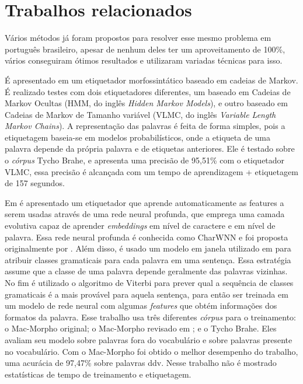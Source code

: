\chapter{Trabalhos relacionados}\label{trabalhosrelacionados}

Vários métodos já foram propostos para resolver esse mesmo problema em português brasileiro, apesar de nenhum deles ter um aproveitamento de 100\%, vários conseguiram ótimos resultados e utilizaram variadas técnicas para isso.

É apresentado em \cite{kepler2005etiquetador} um etiquetador morfossintático baseado em cadeias de Markov. É realizado testes com dois etiquetadores diferentes, um baseado em Cadeias de Markov Ocultas (HMM, do inglês \textit{Hidden Markov Models}), e outro baseado em Cadeias de Markov de Tamanho variável (VLMC, do inglês \textit{Variable Length Markov Chains}). A representação das palavras é feita de forma simples, pois a etiquetagem baseia-se em modelos probabilísticos, onde a etiqueta de uma palavra depende da própria palavra e de etiquetas anteriores. Ele é testado sobre o \textit{córpus} Tycho Brahe, e apresenta uma precisão de 95,51\% com o etiquetador VLMC, essa precisão é alcançada com um tempo de aprendizagem + etiquetagem de 157 segundos. 

Em \cite{dos2014training} é apresentado um etiquetador que aprende automaticamente as features a serem usadas através de uma rede neural profunda, que emprega uma camada evolutiva capaz de aprender \textit{embeddings} em nível de caractere e em nível de palavra. Essa rede neural profunda é conhecida como CharWNN e foi proposta originalmente por . Além disso, é usado um modelo em janela utilizado em \cite{collobert2011natural} para atribuir classes gramaticais para cada palavra em uma sentença. Essa estratégia assume que a classe de uma palavra depende geralmente das palavras vizinhas. No fim é utilizado o algoritmo de Viterbi \cite{viterbi1967error} para prever qual a sequência de classes gramaticais é a mais provável para aquela sentença, para então ser treinada em um modelo de rede neural com algumas \textit{features} que obtém informações dos formatos da palavra. Esse trabalho usa três diferentes \textit{córpus} para o treinamento: o Mac-Morpho original; o Mac-Morpho revisado em \cite{fonseca2013mac}; e o Tycho Brahe. Eles avaliam seu modelo sobre palavras fora do vocabulário e sobre palavras presente no vocabulário. Com o Mac-Morpho foi obtido o melhor desempenho do trabalho, uma acurácia de 97,47\% sobre palavras \ac{ddv}. Nesse trabalho não é mostrado estatísticas de tempo de treinamento e etiquetagem.

